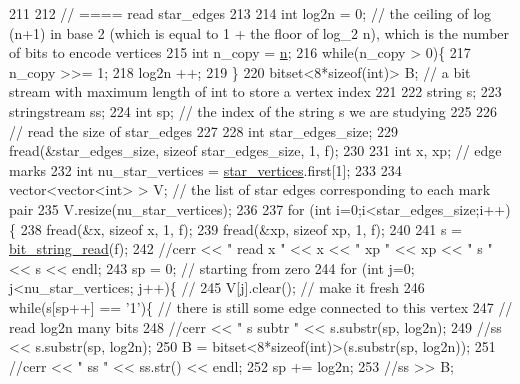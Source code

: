 \begin{DoxyCode}
211 
212   \textcolor{comment}{// ==== read star\_edges}
213 
214   \textcolor{keywordtype}{int} log2n = 0; \textcolor{comment}{// the ceiling of log (n+1) in base 2 (which is equal to 1 + the floor of log\_2 n), which
       is the number of bits to encode vertices}
215   \textcolor{keywordtype}{int} n\_copy = \hyperlink{classmarked__graph__compressed_a8d841016ddb11cfd33748c8deb6277ba}{n};
216   \textcolor{keywordflow}{while}(n\_copy > 0)\{
217     n\_copy >>= 1;
218     log2n ++;
219   \}
220   bitset<8*sizeof(int)> B; \textcolor{comment}{// a bit stream with maximum length of int to store a vertex index}
221 
222   \textcolor{keywordtype}{string} s;
223   stringstream ss;
224   \textcolor{keywordtype}{int} sp; \textcolor{comment}{// the index of the string s we are studying }
225 
226   \textcolor{comment}{// read the size of star\_edges}
227 
228   \textcolor{keywordtype}{int} star\_edges\_size;
229   fread(&star\_edges\_size, \textcolor{keyword}{sizeof} star\_edges\_size, 1, f);
230 
231   \textcolor{keywordtype}{int} x, xp; \textcolor{comment}{// edge marks}
232   \textcolor{keywordtype}{int} nu\_star\_vertices = \hyperlink{classmarked__graph__compressed_a7a4ced4586e2e353f9076bd447df5208}{star\_vertices}.first[1];
233 
234   vector<vector<int> > V; \textcolor{comment}{// the list of star edges corresponding to each mark pair}
235   V.resize(nu\_star\_vertices);
236 
237   \textcolor{keywordflow}{for} (\textcolor{keywordtype}{int} i=0;i<star\_edges\_size;i++)\{
238     fread(&x, \textcolor{keyword}{sizeof} x, 1, f);
239     fread(&xp, \textcolor{keyword}{sizeof} xp, 1, f);
240   
241     s = \hyperlink{compression__helper_8cpp_a40e8dcbc036f96b28e003e882c4890b7}{bit\_string\_read}(f);
242     \textcolor{comment}{//cerr << " read  x " << x << " xp " << xp << " s " << s << endl;}
243     sp = 0; \textcolor{comment}{// starting from zero }
244     \textcolor{keywordflow}{for} (\textcolor{keywordtype}{int} j=0; j<nu\_star\_vertices; j++)\{ \textcolor{comment}{// }
245       V[j].clear(); \textcolor{comment}{// make it fresh}
246       \textcolor{keywordflow}{while}(s[sp++] == \textcolor{charliteral}{'1'})\{ \textcolor{comment}{// there is still some edge connected to this vertex }
247         \textcolor{comment}{// read log2n many bits}
248         \textcolor{comment}{//cerr << " s subtr " << s.substr(sp, log2n);}
249         \textcolor{comment}{//ss << s.substr(sp, log2n);}
250         B = bitset<8*sizeof(int)>(s.substr(sp, log2n));
251         \textcolor{comment}{//cerr << " ss " << ss.str() << endl;}
252         sp += log2n;
253         \textcolor{comment}{//ss >> B;}

\end{DoxyCode}
